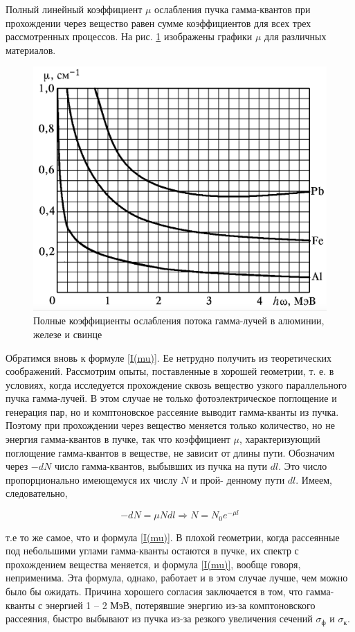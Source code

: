 \documentclass[a4paper,12pt]{article} %
\begin{document}
\noindent Полный линейный коэффициент $ \mu $ ослабления пучка гамма-квантов при прохождении через вещество равен сумме коэффициентов для всех трех рассмотренных процессов. На рис. \ref{ris mu} изображены графики $ \mu $ для различных материалов.
	
	\begin{figure}[h!]
		\centering
		\includegraphics[width=0.6\linewidth]{mu}
		\caption{Полные коэффициенты ослабления потока гамма-лучей в алюминии, железе и свинце}
		\label{ris mu}
	\end{figure}
	
	\medskip
	
\noindent Обратимся вновь к формуле \eqref{I(mu)}. Ее нетрудно получить из теоретических соображений. Рассмотрим опыты, поставленные в хорошей
	геометрии, т. е. в условиях, когда исследуется прохождение сквозь вещество узкого параллельного пучка гамма-лучей. В этом случае не только
	фотоэлектрическое поглощение и генерация пар, но и комптоновское
	рассеяние выводит гамма-кванты из пучка.
	Поэтому при прохождении через вещество меняется только количество, но не энергия гамма-квантов в пучке, так что коэффициент $ \mu $, характеризующий поглощение гамма-квантов в веществе, не зависит от длины
	пути. Обозначим через $ -dN $ число гамма-квантов, выбывших из пучка на
	пути $ dl $. Это число пропорционально имеющемуся их числу $ N $ и прой-
	денному пути $ dl $. Имеем, следовательно,
	
	\begin{equation}\label{N}
	-dN = \mu N dl \Rightarrow N = N_0 e^{-\mu l}
	\end{equation}
	
	\medskip
	
\noindent т.е то же самое, что и формула \eqref{I(mu)}. В плохой геометрии, когда рассеянные под небольшими углами
	гамма-кванты остаются в пучке, их спектр с прохождением вещества меняется, и формула \eqref{I(mu)}, вообще говоря, неприменима. Эта формула, однако, работает и в этом случае лучше, чем можно было бы ожидать. Причина хорошего согласия заключается в том, что гамма-кванты с энергией 1 -- 2 МэВ, потерявшие энергию из-за комптоновского рассеяния,
	быстро выбывают из пучка из-за резкого увеличения сечений $ \sigma_\text{ф} $ и $ \sigma_\text{к} $.
	
\end{document}
